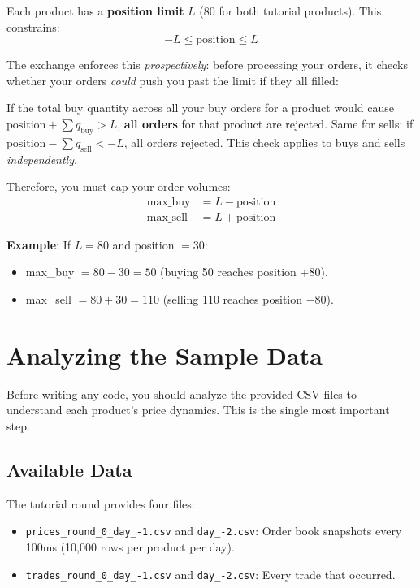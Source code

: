 \documentclass[11pt, letterpaper]{article}
\begin{document}
Each product has a \textbf{position limit} $L$ (80 for both tutorial products). This constrains:
\begin{equation}
    -L \leq \text{position} \leq L
\end{equation}

The exchange enforces this \emph{prospectively}: before processing your orders, it checks whether your orders \emph{could} push you past the limit if they all filled:

\begin{warning}
If the total buy quantity across all your buy orders for a product would cause $\text{position} + \sum q_{\text{buy}} > L$, \textbf{all orders} for that product are rejected. Same for sells: if $\text{position} - \sum q_{\text{sell}} < -L$, all orders rejected. This check applies to buys and sells \emph{independently}.
\end{warning}

Therefore, you must cap your order volumes:
\begin{align}
    \text{max\_buy}  &= L - \text{position} \label{eq:max-buy} \\
    \text{max\_sell} &= L + \text{position} \label{eq:max-sell}
\end{align}

\textbf{Example}: If $L = 80$ and position $= 30$:
\begin{itemize}
    \item max\_buy $= 80 - 30 = 50$ (buying 50 reaches position $+80$).
    \item max\_sell $= 80 + 30 = 110$ (selling 110 reaches position $-80$).
\end{itemize}


\section{Analyzing the Sample Data}

Before writing any code, you should analyze the provided CSV files to understand each product's price dynamics. This is the single most important step.

\subsection{Available Data}

The tutorial round provides four files:
\begin{itemize}
    \item \texttt{prices\_round\_0\_day\_-1.csv} and \texttt{day\_-2.csv}: Order book snapshots every 100ms (10{,}000 rows per product per day).
    \item \texttt{trades\_round\_0\_day\_-1.csv} and \texttt{day\_-2.csv}: Every trade that occurred.
\end{itemize}
\end{document}
